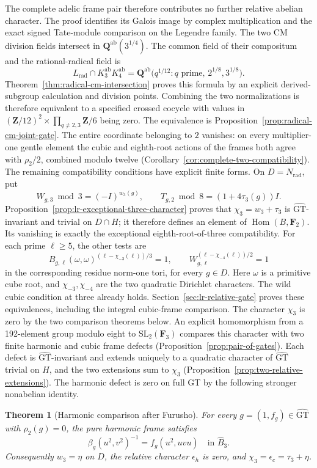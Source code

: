 \documentclass[11pt,a4paper]{article}
\newtheorem{theorem}{Theorem}[section]
\theoremstyle{definition}
\theoremstyle{remark}
\newcommand{\GT}{\widehat{\mathrm{GT}}}
\newcommand{\Z}{\mathbf Z}
\newcommand{\Q}{\mathbf Q}
\newcommand{\F}{\mathbf F}
\newcommand{\ab}{\mathrm{ab}}
\DeclareMathOperator{\Hom}{Hom}
\begin{document}
The complete adelic frame pair therefore contributes no further
relative abelian character.  The proof identifies its Galois image
by complex multiplication and the exact signed Tate-module comparison
on the Legendre family.  The two CM division fields intersect in
$\Q^{\ab}(3^{1/4})$.  The common field of their compositum and the rational-radical field is
\[
 L_{\mathrm{rad}}\cap K_3^{\ab}K_4^{\ab}
 =\Q^{\ab}\bigl(q^{1/12}:q\text{ prime},\,2^{1/8},3^{1/8}\bigr).
\]
Theorem~\ref{thm:radical-cm-intersection} proves this formula by an
explicit derived-subgroup calculation and division points.  Combining
the two normalizations is therefore equivalent to a specified crossed
cocycle with values in
$(\Z/12)^2\times\prod_{q\ne2,3}\Z/6$ being zero.
The equivalence is Proposition~\ref{prop:radical-cm-joint-gate}.
The entire coordinate belonging to $2$ vanishes: on every multiplier-one
gentle element the cubic and eighth-root actions of the frames both agree
with $\rho_2/2$, combined modulo twelve
(Corollary~\ref{cor:complete-two-compatibility}).
The remaining compatibility conditions have explicit finite forms.
On $D=N_{\mathrm{rad}}$, put
\[
 W_{g,3}\bmod3=(-I)^{w_3(g)},\qquad
 T_{g,2}\bmod8=(1+4\tau_3(g))I.
\]
Proposition~\ref{prop:lr-exceptional-three-character} proves that
$\chi_3=w_3+\tau_3$ is $\GT$-invariant and trivial on $D\cap H$;
it therefore defines an element of $\Hom(B,\F_2)$. Its vanishing
is exactly the exceptional eighth-root-of-three compatibility.
For each prime $\ell\ge5$, the other tests are
\[
 B_{g,\ell}(\omega,\omega)^{(\ell-\chi_{-3}(\ell))/3}=1,
 \qquad
 W_{g,\ell}^{(\ell-\chi_{-4}(\ell))/2}=1
\]
in the corresponding residue norm-one tori, for every $g\in D$.
Here $\omega$ is a primitive cube root, and
$\chi_{-3},\chi_{-4}$ are the two quadratic Dirichlet characters.
The wild cubic condition at three already holds.
Section~\ref{sec:lr-relative-gate} proves these equivalences, including
the integral cubic-frame comparison. The character $\chi_3$ is zero
by the two comparison theorems below. An explicit homomorphism from a
192-element group modulo eight to $\mathrm{SL}_2(\mathbf F_3)$
compares this character with two finite harmonic and cubic frame
defects (Proposition~\ref{prop:pair-of-gates}). Each defect is $\GT$-invariant and extends uniquely to a
quadratic character of $\GT$ trivial on $H$, and the two
extensions sum to $\chi_3$
(Proposition~\ref{prop:two-relative-extensions}).
The harmonic defect is zero on full GT by the following stronger
nonabelian identity.

\begin{theorem}[Harmonic comparison after Furusho]
\label{thm:main-harmonic-dyadic}
For every $g=(1,f_g)\in\GT$ with $\rho_2(g)=0$, the pure
harmonic frame satisfies
\[
 \beta_g(u^2,v^2)^{-1}=f_g(u^2,uvu)
 \quad\text{in }\widehat B_3.
\]
Consequently $w_3=\eta$ on $D$, the relative character
$\epsilon_h$ is zero, and $\chi_3=\epsilon_c=\tau_3+\eta$.
\end{theorem}
\end{document}
